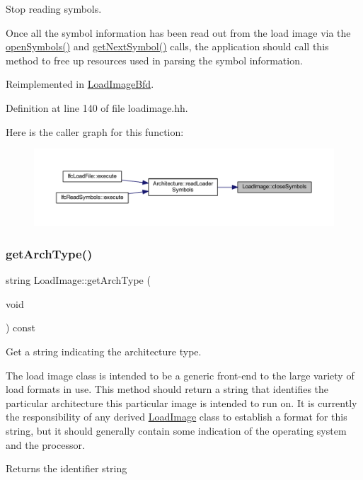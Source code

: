 Stop reading symbols. 

Once all the symbol information has been read out from the load image via the \mbox{\hyperlink{class_load_image_a5b17f1d68413ab802966bdc7aa07cc73}{open\+Symbols()}} and \mbox{\hyperlink{class_load_image_af4a887cf44c719c576bb05605a4c5c7e}{get\+Next\+Symbol()}} calls, the application should call this method to free up resources used in parsing the symbol information. 

Reimplemented in \mbox{\hyperlink{class_load_image_bfd_aaf25ff18d5cec7300dcd28ca4150b8ce}{Load\+Image\+Bfd}}.



Definition at line 140 of file loadimage.\+hh.

Here is the caller graph for this function\+:
\nopagebreak
\begin{figure}[H]
\begin{center}
\leavevmode
\includegraphics[width=350pt]{class_load_image_a58c86c5342b7500e317ba98bcbf66753_icgraph}
\end{center}
\end{figure}
\mbox{\label{class_load_image_a5103418147e95994f66e77746c0a0cfc}} 
\subsubsection{\texorpdfstring{getArchType()}{getArchType()}}
{\footnotesize\ttfamily string Load\+Image\+::get\+Arch\+Type (\begin{DoxyParamCaption}\item[{void}]{ }\end{DoxyParamCaption}) const\hspace{0.3cm}{\ttfamily [pure virtual]}}



Get a string indicating the architecture type. 

The load image class is intended to be a generic front-\/end to the large variety of load formats in use. This method should return a string that identifies the particular architecture this particular image is intended to run on. It is currently the responsibility of any derived \mbox{\hyperlink{class_load_image}{Load\+Image}} class to establish a format for this string, but it should generally contain some indication of the operating system and the processor. \begin{DoxyReturn}{Returns}
the identifier string 
\end{DoxyReturn}


